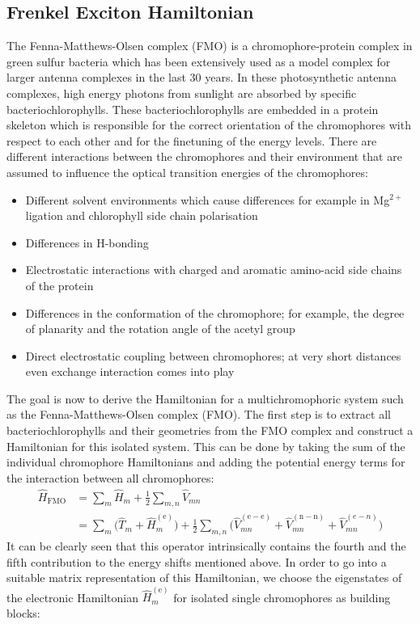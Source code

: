 \documentclass[9pt]{report}
\begin{document}
\subsection{Frenkel Exciton Hamiltonian}
The Fenna-Matthews-Olsen complex (FMO) is a chromophore-protein complex in green sulfur bacteria which has been extensively used as a model complex for larger antenna complexes in the last 30 years. In these photosynthetic antenna complexes, high energy photons from sunlight are absorbed by specific bacteriochlorophylls. These bacteriochlorophylls are embedded in a protein skeleton which is responsible for the correct orientation of the chromophores with respect to each other and for the finetuning of the energy levels. There are different interactions between the chromophores and their environment that are assumed to influence the optical transition energies of the chromophores:
\begin{itemize}
	\item Different solvent environments which cause differences for example in Mg$^{2+}$ ligation and chlorophyll side chain polarisation
	\item Differences in H-bonding
	\item Electrostatic interactions with charged and aromatic amino-acid side chains of the protein
	\item Differences in the conformation of the chromophore; for example, the degree of planarity and the rotation angle of the acetyl group
	\item Direct electrostatic coupling between chromophores; at very short distances even exchange interaction comes into play
\end{itemize}
The goal is now to derive the Hamiltonian for a multichromophoric system such as the Fenna-Matthews-Olsen complex (FMO). The first step is to extract all bacteriochlorophylls and their geometries from the FMO complex and construct a Hamiltonian for this isolated system. This can be done by taking the sum of the individual chromophore Hamiltonians and adding the potential energy terms for the interaction between all chromophores:
\begin{align}
\hat{H}_{\mathrm{FMO}}&=\sum_{m}\hat{H}_{m}+\frac{1}{2}\sum_{m,n}\hat{V}_{mn}\\
&= \sum_{m}\big(\hat{T}_m+\hat{H}_m^{\mathrm{(e)}}\big)+\frac{1}{2}\sum_{m,n}\big(\hat{V}_{mn}^{\mathrm{(e-e)}}+\hat{V}_{mn}^{\mathrm{(n-n)}}+\hat{V}_{mn}^{(e-n)}\big)
\end{align}
It can be clearly seen that this operator intrinsically contains the fourth and the fifth contribution to the energy shifts mentioned above. In order to go into a suitable matrix representation of this Hamiltonian, we choose the eigenstates of the electronic Hamiltonian $\hat{H}_{m}^{\mathrm{(e)}}$ for isolated single chromophores as building blocks:
\end{document}
